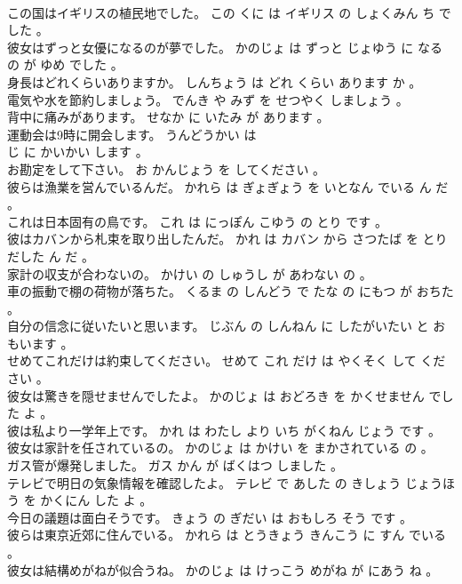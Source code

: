 \documentclass[8pt]{extreport}
\begin{document}
\begin{CJK}{UTF8}{min}
\\	この国はイギリスの植民地でした。	この くに は イギリス の しょくみん ち でした 。 
\\	彼女はずっと女優になるのが夢でした。	かのじょ は ずっと じょゆう に なる の が ゆめ でした 。 
\\	身長はどれくらいありますか。	しんちょう は どれ くらい あります か 。 
\\	電気や水を節約しましょう。	でんき や みず を せつやく しましょう 。 
\\	背中に痛みがあります。	せなか に いたみ が あります 。 
\\	運動会は9時に開会します。	うんどうかい は 
\\	じ に かいかい します 。 
\\	お勘定をして下さい。	お かんじょう を してください 。 
\\	彼らは漁業を営んでいるんだ。	かれら は ぎょぎょう を いとなん でいる ん だ 。 
\\	これは日本固有の鳥です。	これ は にっぽん こゆう の とり です 。 
\\	彼はカバンから札束を取り出したんだ。	かれ は カバン から さつたば を とりだした ん だ 。 
\\	家計の収支が合わないの。	かけい の しゅうし が あわない の 。 
\\	車の振動で棚の荷物が落ちた。	くるま の しんどう で たな の にもつ が おちた 。 
\\	自分の信念に従いたいと思います。	じぶん の しんねん に したがいたい と おもいます 。 
\\	せめてこれだけは約束してください。	せめて これ だけ は やくそく して ください 。 
\\	彼女は驚きを隠せませんでしたよ。	かのじょ は おどろき を かくせません でした よ 。 
\\	彼は私より一学年上です。	かれ は わたし より いち がくねん じょう です 。 
\\	彼女は家計を任されているの。	かのじょ は かけい を まかされている の 。 
\\	ガス管が爆発しました。	ガス かん が ばくはつ しました 。 
\\	テレビで明日の気象情報を確認したよ。	テレビ で あした の きしょう じょうほう を かくにん した よ 。 
\\	今日の議題は面白そうです。	きょう の ぎだい は おもしろ そう です 。 
\\	彼らは東京近郊に住んでいる。	かれら は とうきょう きんこう に すん でいる 。 
\\	彼女は結構めがねが似合うね。	かのじょ は けっこう めがね が にあう ね 。 

\end{CJK}
\end{document}
